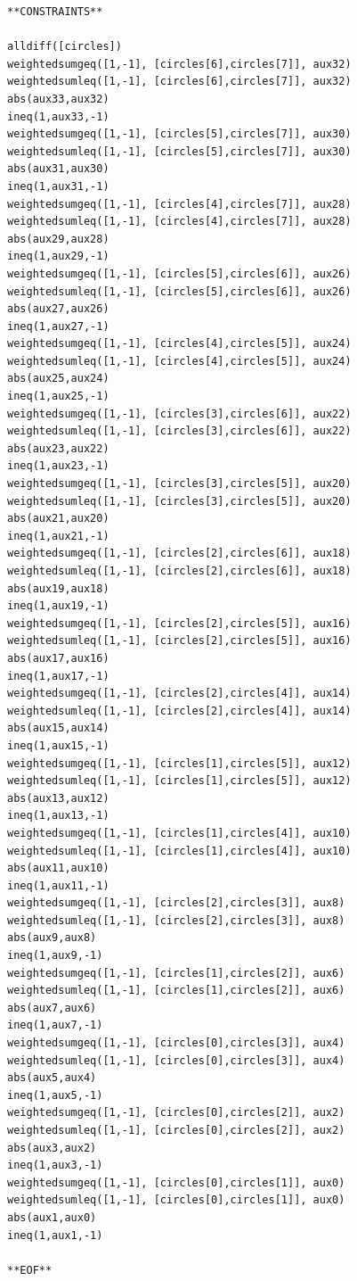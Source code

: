 \documentclass[oneside]{book}
\begin{document}
\begin{verbatim}
**CONSTRAINTS**

alldiff([circles])
weightedsumgeq([1,-1], [circles[6],circles[7]], aux32)
weightedsumleq([1,-1], [circles[6],circles[7]], aux32)
abs(aux33,aux32)
ineq(1,aux33,-1)
weightedsumgeq([1,-1], [circles[5],circles[7]], aux30)
weightedsumleq([1,-1], [circles[5],circles[7]], aux30)
abs(aux31,aux30)
ineq(1,aux31,-1)
weightedsumgeq([1,-1], [circles[4],circles[7]], aux28)
weightedsumleq([1,-1], [circles[4],circles[7]], aux28)
abs(aux29,aux28)
ineq(1,aux29,-1)
weightedsumgeq([1,-1], [circles[5],circles[6]], aux26)
weightedsumleq([1,-1], [circles[5],circles[6]], aux26)
abs(aux27,aux26)
ineq(1,aux27,-1)
weightedsumgeq([1,-1], [circles[4],circles[5]], aux24)
weightedsumleq([1,-1], [circles[4],circles[5]], aux24)
abs(aux25,aux24)
ineq(1,aux25,-1)
weightedsumgeq([1,-1], [circles[3],circles[6]], aux22)
weightedsumleq([1,-1], [circles[3],circles[6]], aux22)
abs(aux23,aux22)
ineq(1,aux23,-1)
weightedsumgeq([1,-1], [circles[3],circles[5]], aux20)
weightedsumleq([1,-1], [circles[3],circles[5]], aux20)
abs(aux21,aux20)
ineq(1,aux21,-1)
weightedsumgeq([1,-1], [circles[2],circles[6]], aux18)
weightedsumleq([1,-1], [circles[2],circles[6]], aux18)
abs(aux19,aux18)
ineq(1,aux19,-1)
weightedsumgeq([1,-1], [circles[2],circles[5]], aux16)
weightedsumleq([1,-1], [circles[2],circles[5]], aux16)
abs(aux17,aux16)
ineq(1,aux17,-1)
weightedsumgeq([1,-1], [circles[2],circles[4]], aux14)
weightedsumleq([1,-1], [circles[2],circles[4]], aux14)
abs(aux15,aux14)
ineq(1,aux15,-1)
weightedsumgeq([1,-1], [circles[1],circles[5]], aux12)
weightedsumleq([1,-1], [circles[1],circles[5]], aux12)
abs(aux13,aux12)
ineq(1,aux13,-1)
weightedsumgeq([1,-1], [circles[1],circles[4]], aux10)
weightedsumleq([1,-1], [circles[1],circles[4]], aux10)
abs(aux11,aux10)
ineq(1,aux11,-1)
weightedsumgeq([1,-1], [circles[2],circles[3]], aux8)
weightedsumleq([1,-1], [circles[2],circles[3]], aux8)
abs(aux9,aux8)
ineq(1,aux9,-1)
weightedsumgeq([1,-1], [circles[1],circles[2]], aux6)
weightedsumleq([1,-1], [circles[1],circles[2]], aux6)
abs(aux7,aux6)
ineq(1,aux7,-1)
weightedsumgeq([1,-1], [circles[0],circles[3]], aux4)
weightedsumleq([1,-1], [circles[0],circles[3]], aux4)
abs(aux5,aux4)
ineq(1,aux5,-1)
weightedsumgeq([1,-1], [circles[0],circles[2]], aux2)
weightedsumleq([1,-1], [circles[0],circles[2]], aux2)
abs(aux3,aux2)
ineq(1,aux3,-1)
weightedsumgeq([1,-1], [circles[0],circles[1]], aux0)
weightedsumleq([1,-1], [circles[0],circles[1]], aux0)
abs(aux1,aux0)
ineq(1,aux1,-1)

**EOF**
\end{verbatim}
\end{document}
